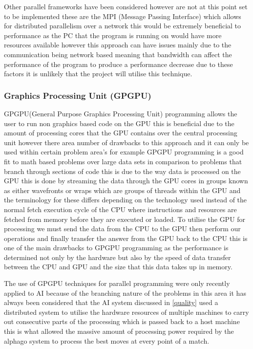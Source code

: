 Other parallel frameworks have been considered however are not at this point set to be implemented these are the MPI (Message Passing Interface)\cite{mpi} which allows for distributed parallelism over a network this would be extremely beneficial to performance as the PC that the program is running on would have more resources available however this approach can have issues mainly due to the communication being network based meaning that bandwidth can affect the performance of the program to produce a performance decrease due to these factors it is unlikely that the project will utilise this technique. 

\subsubsection{Graphics Processing Unit (GPGPU)}
GPGPU(General Purpose Graphics Processing Unit) programming allows the user to run non graphics based code on the GPU this is beneficial due to the amount of processing cores that the GPU contains over the central processing unit  however there area number of drawbacks to this approach and it can only be used within certain problem area's for example GPGPU programming is a good fit to math based problems over large data sets in comparison to problems that branch through sections of code this is due to the way data is processed on the GPU this is done by streaming the data through the GPU cores in groups known as either wavefronts or wraps which are groups of threads within the GPU and the terminology for these differs depending on the technology used instead of the normal fetch execution cycle of the CPU where instructions and resources are fetched from memory before they are executed or loaded. To utilise the GPU for processing we must send the data from the CPU to the GPU then perform our operations and finally transfer the answer from the GPU back to the CPU this is one of the main drawbacks to GPGPU programming as the performance is determined not only by the hardware but also by the speed of data transfer between the CPU and GPU and the size that this data takes up in memory.    

The use of GPGPU techniques for parallel programming were only recently applied to AI because of the branching nature of the problems in this area it has always been considered that  the AI system discussed in \ref{quality} used a distributed system to utilise the hardware resources of multiple machines to carry out consecutive parts of the processing which is passed back to a host machine this is what allowed the massive amount of processing power required by the alphago system to process the best moves at every point of a match. 

